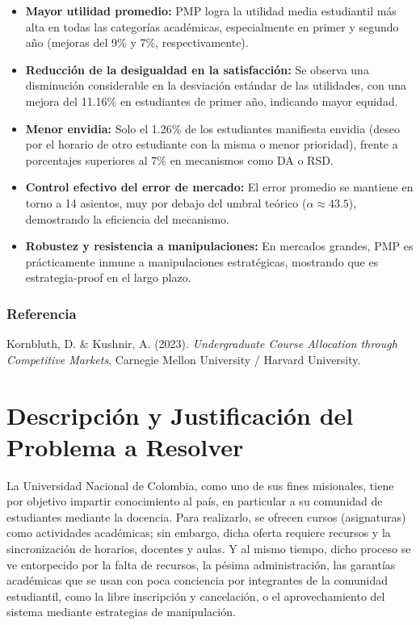 \documentclass{article}
\begin{document}
\begin{itemize}
    \item \textbf{Mayor utilidad promedio:} PMP logra la utilidad media estudiantil más alta en todas las categorías académicas, especialmente en primer y segundo año (mejoras del 9\% y 7\%, respectivamente).

    \item \textbf{Reducción de la desigualdad en la satisfacción:} Se observa una disminución considerable en la desviación estándar de las utilidades, con una mejora del 11.16\% en estudiantes de primer año, indicando mayor equidad.

    \item \textbf{Menor envidia:} Solo el 1.26\% de los estudiantes manifiesta envidia (deseo por el horario de otro estudiante con la misma o menor prioridad), frente a porcentajes superiores al 7\% en mecanismos como DA o RSD.

    \item \textbf{Control efectivo del error de mercado:} El error promedio se mantiene en torno a 14 asientos, muy por debajo del umbral teórico ($\alpha \approx 43.5$), demostrando la eficiencia del mecanismo.

    \item \textbf{Robustez y resistencia a manipulaciones:} En mercados grandes, PMP es prácticamente inmune a manipulaciones estratégicas, mostrando que es estrategia-proof en el largo plazo.
\end{itemize}

\subsubsection{Referencia}

Kornbluth, D. \& Kushnir, A. (2023). \textit{Undergraduate Course Allocation through Competitive Markets}. Carnegie Mellon University / Harvard University.


\section{Descripción y Justificación del Problema a Resolver}\label{sec:descr}

La Universidad Nacional de Colombia, como uno de sus fines misionales, tiene por objetivo impartir 
conocimiento al país, en particular a su comunidad de estudiantes mediante la docencia. Para 
realizarlo, se ofrecen cursos (asignaturas) como actividades académicas; sin embargo, dicha oferta 
requiere recursos y la sincronización de horarios, docentes y aulas. Y al mismo tiempo, dicho proceso 
se ve entorpecido por la falta de recursos, la pésima administración, las garantías académicas que se 
usan con poca conciencia por integrantes de la comunidad estudiantil, como la libre inscripción y 
cancelación, o el aprovechamiento del sistema mediante estrategias de manipulación.
\end{document}

